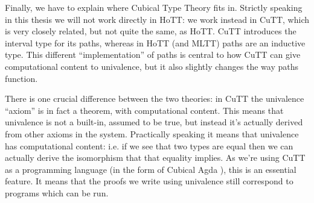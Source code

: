 Finally, we have to explain where Cubical Type Theory
\citep{cohenCubicalTypeTheory2016} fits in.
Strictly speaking in this thesis we will not work directly in HoTT: we work
instead in CuTT, which is very closely related, but not quite the same, as HoTT.
CuTT introduces the interval type for its paths, whereas in HoTT (and MLTT)
 paths are an inductive type.
This different ``implementation'' of paths is central to how CuTT can give
computational content to univalence, but it also slightly changes the way paths
function.


There is one crucial difference between the two theories: in CuTT the
univalence ``axiom'' is in fact a theorem, with computational content.
This means that univalence is not a built-in, assumed to be true, but instead
it's actually derived from other axioms in the system.
Practically speaking it means that univalence has computational content: i.e. if
we see that two types are equal then we can actually derive the isomorphism that
that equality implies.
As we're using CuTT as a programming language (in the form of Cubical Agda
\citep{vezzosiCubicalAgdaDependently2019}), this is an essential feature.
It means that the proofs we write using univalence still correspond to programs
which can be run.



